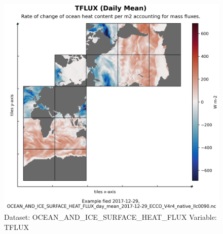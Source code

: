 \begin{figure}[H]
\centering
\includegraphics[scale=0.55]{../images/plots/native_plots/Ocean_and_Sea-Ice_Surface_Heat_Fluxes/TFLUX.png}
\caption{Dataset: OCEAN\_AND\_ICE\_SURFACE\_HEAT\_FLUX Variable: TFLUX}
\label{tab:table-OCEAN_AND_ICE_SURFACE_HEAT_FLUX_TFLUX-Plot}
\end{figure}
\pagebreak
